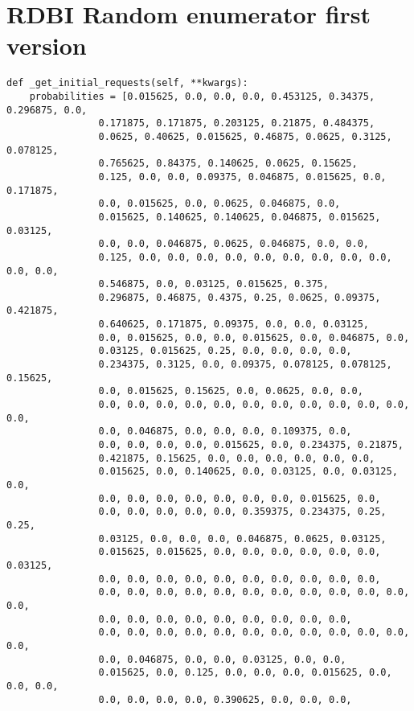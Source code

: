 \appendix

\section{RDBI Random enumerator first version}
\label{app:random-not-compact}

\begin{verbatim}
def _get_initial_requests(self, **kwargs):
    probabilities = [0.015625, 0.0, 0.0, 0.0, 0.453125, 0.34375, 0.296875, 0.0,
                0.171875, 0.171875, 0.203125, 0.21875, 0.484375,
                0.0625, 0.40625, 0.015625, 0.46875, 0.0625, 0.3125, 0.078125,
                0.765625, 0.84375, 0.140625, 0.0625, 0.15625,
                0.125, 0.0, 0.0, 0.09375, 0.046875, 0.015625, 0.0, 0.171875,
                0.0, 0.015625, 0.0, 0.0625, 0.046875, 0.0,
                0.015625, 0.140625, 0.140625, 0.046875, 0.015625, 0.03125,
                0.0, 0.0, 0.046875, 0.0625, 0.046875, 0.0, 0.0,
                0.125, 0.0, 0.0, 0.0, 0.0, 0.0, 0.0, 0.0, 0.0, 0.0, 0.0, 0.0,
                0.546875, 0.0, 0.03125, 0.015625, 0.375,
                0.296875, 0.46875, 0.4375, 0.25, 0.0625, 0.09375, 0.421875,
                0.640625, 0.171875, 0.09375, 0.0, 0.0, 0.03125,
                0.0, 0.015625, 0.0, 0.0, 0.015625, 0.0, 0.046875, 0.0,
                0.03125, 0.015625, 0.25, 0.0, 0.0, 0.0, 0.0,
                0.234375, 0.3125, 0.0, 0.09375, 0.078125, 0.078125, 0.15625,
                0.0, 0.015625, 0.15625, 0.0, 0.0625, 0.0, 0.0,
                0.0, 0.0, 0.0, 0.0, 0.0, 0.0, 0.0, 0.0, 0.0, 0.0, 0.0, 0.0,
                0.0, 0.046875, 0.0, 0.0, 0.0, 0.109375, 0.0,
                0.0, 0.0, 0.0, 0.0, 0.015625, 0.0, 0.234375, 0.21875,
                0.421875, 0.15625, 0.0, 0.0, 0.0, 0.0, 0.0, 0.0,
                0.015625, 0.0, 0.140625, 0.0, 0.03125, 0.0, 0.03125, 0.0,
                0.0, 0.0, 0.0, 0.0, 0.0, 0.0, 0.0, 0.015625, 0.0,
                0.0, 0.0, 0.0, 0.0, 0.0, 0.359375, 0.234375, 0.25, 0.25,
                0.03125, 0.0, 0.0, 0.0, 0.046875, 0.0625, 0.03125,
                0.015625, 0.015625, 0.0, 0.0, 0.0, 0.0, 0.0, 0.0, 0.03125,
                0.0, 0.0, 0.0, 0.0, 0.0, 0.0, 0.0, 0.0, 0.0, 0.0,
                0.0, 0.0, 0.0, 0.0, 0.0, 0.0, 0.0, 0.0, 0.0, 0.0, 0.0, 0.0,
                0.0, 0.0, 0.0, 0.0, 0.0, 0.0, 0.0, 0.0, 0.0,
                0.0, 0.0, 0.0, 0.0, 0.0, 0.0, 0.0, 0.0, 0.0, 0.0, 0.0, 0.0,
                0.0, 0.046875, 0.0, 0.0, 0.03125, 0.0, 0.0,
                0.015625, 0.0, 0.125, 0.0, 0.0, 0.0, 0.015625, 0.0, 0.0, 0.0,
                0.0, 0.0, 0.0, 0.0, 0.390625, 0.0, 0.0, 0.0,

\end{verbatim}
